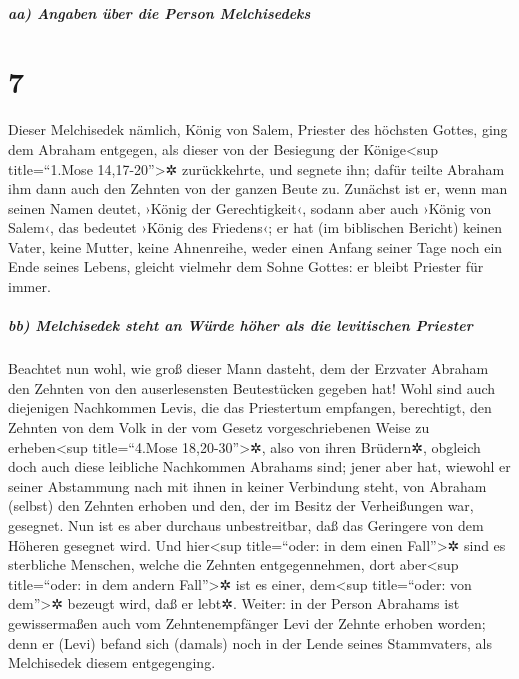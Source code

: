\hypertarget{aa-angaben-uxfcber-die-person-melchisedeks}{%
\subparagraph{aa) Angaben über die Person
Melchisedeks}\label{aa-angaben-uxfcber-die-person-melchisedeks}}

\hypertarget{section-6}{%
\section{7}\label{section-6}}

 Dieser Melchisedek nämlich, König von Salem, Priester des
höchsten Gottes, ging dem Abraham entgegen, als dieser von der Besiegung
der Könige\textless sup title=``1.Mose 14,17-20''\textgreater✲
zurückkehrte, und segnete ihn;  dafür teilte Abraham ihm
dann auch den Zehnten von der ganzen Beute zu. Zunächst ist er, wenn man
seinen Namen deutet, ›König der Gerechtigkeit‹, sodann aber auch ›König
von Salem‹, das bedeutet ›König des Friedens‹;  er hat (im
biblischen Bericht) keinen Vater, keine Mutter, keine Ahnenreihe, weder
einen Anfang seiner Tage noch ein Ende seines Lebens, gleicht vielmehr
dem Sohne Gottes: er bleibt Priester für immer.

\hypertarget{bb-melchisedek-steht-an-wuxfcrde-huxf6her-als-die-levitischen-priester}{%
\subparagraph{bb) Melchisedek steht an Würde höher als die levitischen
Priester}\label{bb-melchisedek-steht-an-wuxfcrde-huxf6her-als-die-levitischen-priester}}

 Beachtet nun wohl, wie groß dieser Mann dasteht, dem der
Erzvater Abraham den Zehnten von den auserlesensten Beutestücken gegeben
hat!  Wohl sind auch diejenigen Nachkommen Levis, die das
Priestertum empfangen, berechtigt, den Zehnten von dem Volk in der vom
Gesetz vorgeschriebenen Weise zu erheben\textless sup title=``4.Mose
18,20-30''\textgreater✲, also von ihren Brüdern✲, obgleich doch auch
diese leibliche Nachkommen Abrahams sind;  jener aber hat,
wiewohl er seiner Abstammung nach mit ihnen in keiner Verbindung steht,
von Abraham (selbst) den Zehnten erhoben und den, der im Besitz der
Verheißungen war, gesegnet.  Nun ist es aber durchaus
unbestreitbar, daß das Geringere von dem Höheren gesegnet wird.
 Und hier\textless sup title=``oder: in dem einen
Fall''\textgreater✲ sind es sterbliche Menschen, welche die Zehnten
entgegennehmen, dort aber\textless sup title=``oder: in dem andern
Fall''\textgreater✲ ist es einer, dem\textless sup title=``oder: von
dem''\textgreater✲ bezeugt wird, daß er lebt✲.  Weiter: in
der Person Abrahams ist gewissermaßen auch vom Zehntenempfänger Levi der
Zehnte erhoben worden;  denn er (Levi) befand sich
(damals) noch in der Lende seines Stammvaters, als Melchisedek diesem
entgegenging.

